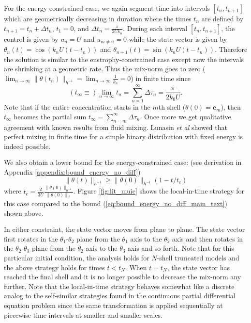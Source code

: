 For the energy-constrained case, we again segment time into intervals $[t_{n},t_{n+1}]$ which are geometrically decreasing in duration where the times  $t_{n}$ are defined by $t_{n+1}= t_{n}+\Delta t_{n}$, $t_{1}=0$, and $\Delta t_{n}= \frac{ \pi }{2Uk _{n}} $. During each interval $[t_{n},t_{n+1}]$, the control is given by $u_{n}= U$ and $u_{m\neq n} = 0$ while the state vector is given by $\theta_{n}(t) =\cos (k_{n} U (t - t_{n}))$ and $\theta_{n+1}(t) = \sin (k_{n} U (t - t_{n})) $. Therefore the solution is similar to the enstrophy-constrained case except now the intervals are shrinking at a geometric rate. Thus the mix-norm goes to zero ($\lim_{n\rightarrow \infty} \| \theta (t_{n}) \|_{h^{-1}}= \lim_{n\rightarrow \infty} \frac{1}{k_{n}} =0$) in finite time since
\begin{equation}
	(t_{\infty}\equiv) \lim_{n \rightarrow \infty} t_{n} = \sum_{n=1}^{\infty} \Delta \tau_{n} =  \frac{ \pi }{2k_{0} U}.
\end{equation}
Note that if the entire concentration starts in the $m$th shell ($\theta(0)=\mathbf{e}_{m}$), then $t_{\infty}$ becomes the partial sum $t_{\infty}=\sum_{n=m}^{\infty}\Delta \tau_{n}$.  Once more we get qualitative agreement with known results from fluid mixing. Lunasin {\it et al} \cite{JMP2012} showed that perfect mixing in finite time for a simple binary distribution with fixed energy is indeed possible. 

We also obtain a lower bound for the energy-constrained case: (see derivation in Appendix \ref{appendix:bound_energy_no_diff})
\begin{equation}
	\label{eq:bound_energy_no_diff_main_text}
	\|\theta (t) \|_{h^{-1}} \geq\|\theta (0) \|_{h^{-1}}(1 -t/t_c)
\end{equation}
where $t_{c}=\frac{2}{3U}\frac{\|\theta(0)\|_{h^{-1}}}{\|\theta (0) \|_{l^{2}}}$. Figure \ref{fig:lit_muic} shows the local-in-time strategy for this case compared to the bound (\ref{eq:bound_energy_no_diff_main_text}) shown above.

In either constraint, the state vector moves from plane to plane. The state vector first rotates in the $\theta_{1}$-$\theta_{2}$ plane from the $\theta_{1}$ axis to the $\theta_{2}$ axis and then rotates in the $\theta_{2}$-$\theta_{3}$ plane from the $\theta_{2}$ axis to the $\theta_{3}$ axis and so forth. Note that for this particular initial condition, the analysis holds for $N$-shell truncated models and the above strategy holds for times $t < t_{N}$. When $t=t_{N}$, the state vector has reached the final shell and it is no longer possible to decrease the mix-norm any further.  Note that the local-in-time strategy behaves somewhat like a discrete analog to the self-similar strategies \cite{Alberti2014a,Yao2014a} found in the continuous partial differential equation problem since the same transformation is applied sequentially at piecewise time intervals at smaller and smaller scales.


